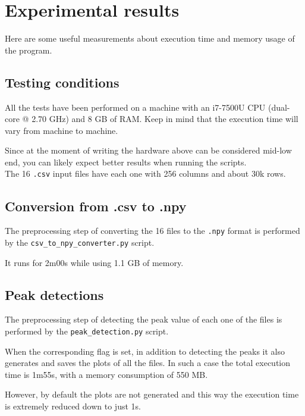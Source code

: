 \documentclass[11pt,a4paper]{article}
\begin{document}
\section{Experimental results}
\label{sec:experimental-results}

Here are some useful measurements about execution time and memory usage of the program.

\subsection{Testing conditions}

All the tests have been performed on a machine with an i7-7500U CPU (dual-core @ 2.70 GHz) and 8 GB of RAM.
Keep in mind that the execution time will vary from machine to machine.

Since at the moment of writing the hardware above can be considered mid-low end, you can likely expect better results when running the scripts.\\

The 16 \texttt{.csv} input files have each one with 256 columns and about 30k rows.

\subsection{Conversion from .csv to .npy}

The preprocessing step of converting the 16 files to the \texttt{.npy} format is performed by the \texttt{csv\_to\_npy\_converter.py} script.

It runs for 2m00s while using 1.1 GB of memory.

\subsection{Peak detections}

The preprocessing step of detecting the peak value of each one of the files is performed by the \texttt{peak\_detection.py} script.

When the corresponding flag is set, in addition to detecting the peaks it also generates and saves the plots of all the files.
In such a case the total execution time is 1m55s, with a memory consumption of 550 MB.

However, by default the plots are not generated and this way the execution time is extremely reduced down to just 1s.
\end{document}
